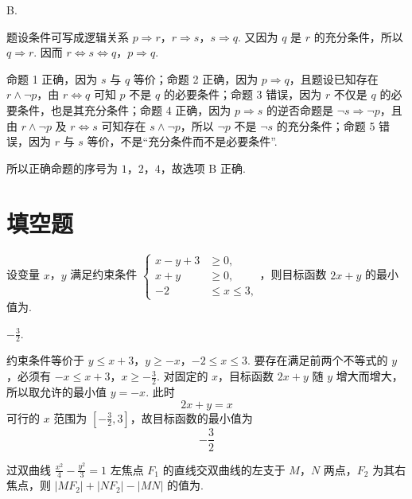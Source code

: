 \begin{answer}
B.
\end{answer}

\begin{solution}
题设条件可写成逻辑关系
\(p\Rightarrow r\)，\(r\Rightarrow s\)，\(s\Rightarrow q\).
又因为 \(q\) 是 \(r\) 的充分条件，所以 \(q\Rightarrow r\). 因而
\(r\Longleftrightarrow s\Longleftrightarrow q\)，\(p\Rightarrow q\).

命题 1 正确，因为 \(s\) 与 \(q\) 等价；命题 2 正确，因为 \(p\Rightarrow q\)，且题设已知存在 \(r\land\neg p\)，由 \(r\Leftrightarrow q\) 可知 \(p\) 不是 \(q\) 的必要条件；命题 3 错误，因为 \(r\) 不仅是 \(q\) 的必要条件，也是其充分条件；命题 4 正确，因为 \(p\Rightarrow s\) 的逆否命题是 \(\neg s\Rightarrow\neg p\)，且由 \(r\land\neg p\) 及 \(r\Leftrightarrow s\) 可知存在 \(s\land\neg p\)，所以 \(\neg p\) 不是 \(\neg s\) 的充分条件；命题 5 错误，因为 \(r\) 与 \(s\) 等价，不是“充分条件而不是必要条件”.

所以正确命题的序号为 \(1\)，\(2\)，\(4\)，故选项 B 正确.
\end{solution}

\section{填空题}

\begin{problem}
设变量 \(x\)，\(y\) 满足约束条件 \( \begin{cases}
x-y+3&\geqslant0,\\
x+y&\geqslant0,\\
-2&\leqslant x\leqslant3,
\end{cases} \)，则目标函数 \(2x+y\) 的最小值为\fillinblank{}.
\end{problem}

\begin{answer}
\(-\frac{3}{2}\).
\end{answer}

\begin{solution}
约束条件等价于
\(y\leqslant x+3\)，\(y\geqslant-x\)，\(-2\leqslant x\leqslant3\).
要存在满足前两个不等式的 \(y\)，必须有
\(-x\leqslant x+3\)，\(x\geqslant-\frac32\).
对固定的 \(x\)，目标函数 \(2x+y\) 随 \(y\) 增大而增大，所以取允许的最小值 \(y=-x\). 此时
\[
2x+y=x
\]
可行的 \(x\) 范围为 \([-\frac32,3]\)，故目标函数的最小值为
\[
-\frac32
\]
\end{solution}

\begin{problem}
过双曲线 \( \frac{x^{2}}{4} - \frac{y^{2}}{3} = 1 \) 左焦点 \(F_{1}\) 的直线交双曲线的左支于 \(M\)，\(N\) 两点，\(F_{2}\) 为其右焦点，则 \( \left|MF_{2}\right| + \left|NF_{2}\right| - \left|MN\right| \) 的值为\fillinblank{}.
\end{problem}

